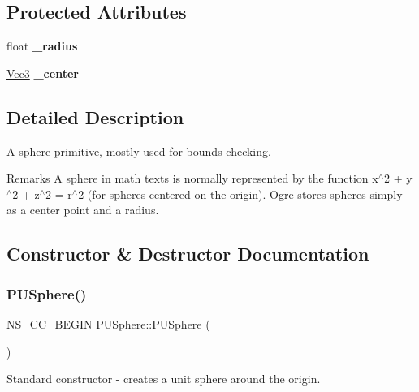\subsection*{Protected Attributes}
\begin{DoxyCompactItemize}
\item 
\mbox{\label{classPUSphere_a89f2ad52da9b523d94fcc0a3cf8a8e3d}} 
float {\bfseries \+\_\+radius}
\item 
\mbox{\label{classPUSphere_abc6ee97866e3d539cf5678d5f356dbca}} 
\hyperlink{classVec3}{Vec3} {\bfseries \+\_\+center}
\end{DoxyCompactItemize}


\subsection{Detailed Description}
A sphere primitive, mostly used for bounds checking. \begin{DoxyRemark}{Remarks}
A sphere in math texts is normally represented by the function x$^\wedge$2 + y$^\wedge$2 + z$^\wedge$2 = r$^\wedge$2 (for sphere\textquotesingle{}s centered on the origin). Ogre stores spheres simply as a center point and a radius. 
\end{DoxyRemark}


\subsection{Constructor \& Destructor Documentation}
\mbox{\label{classPUSphere_af6833d29a3b5fecb8f29d98c1827a7bb}} 
\subsubsection{\texorpdfstring{P\+U\+Sphere()}{PUSphere()}\hspace{0.1cm}{\footnotesize\ttfamily [1/4]}}
{\footnotesize\ttfamily N\+S\+\_\+\+C\+C\+\_\+\+B\+E\+G\+IN P\+U\+Sphere\+::\+P\+U\+Sphere (\begin{DoxyParamCaption}{ }\end{DoxyParamCaption})}

Standard constructor -\/ creates a unit sphere around the origin. \mbox{\label{classPUSphere_a91c8a4763bfba145f5a93309f92ed9de}} 
